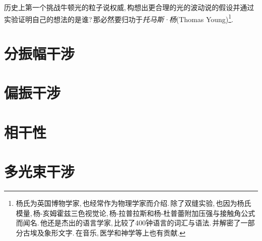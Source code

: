 历史上第一个挑战牛顿光的粒子说权威,\,构想出更合理的光的波动说的假设并通过实验证明自己的想法的是谁?\,那必然要归功于\emph{托马斯·杨}(Thomas Young)\footnote{杨氏为英国博物学家,\,也经常作为物理学家而介绍.\,除了双缝实验,\,也因为杨氏模量,\,杨-亥姆霍兹三色视觉论,\,杨-拉普拉斯和杨-杜普蕾附加压强与接触角公式而闻名.\,他还是杰出的语言学家,\,比较了400钟语言的词汇与语法.\,并解密了一部分古埃及象形文字.\,在音乐,\,医学和神学等上也有贡献.}.\,

\section{分振幅干涉}

\section{偏振干涉}

\section{相干性}

\section{多光束干涉}

